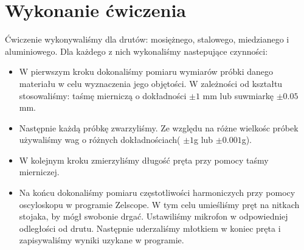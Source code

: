 \documentclass [a4paper,11pt]{article}
\begin{document}
	\section{Wykonanie ćwiczenia}
	Ćwiczenie wykonywaliśmy dla drutów: mosiężnego, stalowego, miedzianego i aluminiowego. Dla każdego z nich wykonaliśmy nastepujące czynności:
	\begin{itemize}
		\item W pierwszym kroku dokonaliśmy pomiaru wymiarów próbki danego materiału w celu wyznaczenia jego objętości. W zależności od kształtu stosowaliśmy: taśmę mierniczą o dokładności $\pm1$ mm lub suwmiarkę $\pm0.05$ mm.
		\item Następnie każdą próbkę zwarzyliśmy. Ze względu na różne wielkośc próbek używaliśmy wag o różnych dokładnościach( $\pm1$g lub $\pm0.001$g).
		
		\item W kolejnym kroku zmierzyliśmy długość pręta przy pomocy taśmy mierniczej.
		
		\item Na końcu dokonaliśmy pomiaru częstotliwości harmoniczych przy pomocy oscyloskopu w programie Zelscope. W tym celu umieśliśmy pręt na nitkach stojaka, by mógł swobonie drgać. Ustawiliśmy mikrofon w odpowiedniej odległości od drutu. Następnie uderzaliśmy młotkiem w koniec pręta i zapisywaliśmy wyniki uzykane w programie.  
	\end{itemize}
\end{document}
